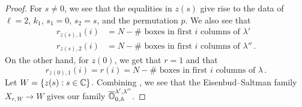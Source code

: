 \documentclass[draft]{article}
\begin{document}
\begin{proof}
For $ s \ne 0$, we see that the equalities in $ z(s) $ give rise to the data of $ \ell = 2$, $k_1$, $s_1 = 0$, $s_2 = s$, and the permutation $p $.
We also see that
\begin{equation} 
\label{eq:rcols}
    \begin{split}
            r_{z(s), 1}(i) &=  N - \#\text{~boxes in first $i$ columns of }\lambda' \\
            r_{z(s), 2}(i) &=  N - \#\text{~boxes in first $i$ columns of }\lambda'' \,. 
    \end{split}
\end{equation}
On the other hand, for $z(0)$, we get that $ r = 1$ and that 
\begin{equation} 
\label{eq:rcol2}
    r_{z(0),1}(i) = 
    r(i) = N - \#\text{~boxes in first $i$ columns of }\lambda\,. 
\end{equation}
% 
% 
% 
Let $ W = \{ z(s) : s \in \mathbb C \}$. Combining ,
we see that the Eisenbud--Saltman family $ X_{r, W} \rightarrow W $ gives our family $ \overline{\mathbb O}^{\lambda', \lambda''}_{0, \mathbb A}$.
\end{proof}
% 
% 
\end{document}
